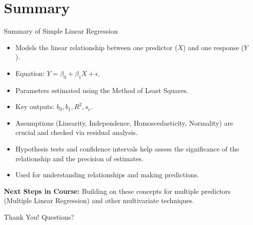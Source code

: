 \documentclass[aspectratio=169]{beamer}
\begin{document}
\section{Summary}
\begin{frame}{Summary of Simple Linear Regression}
  \begin{itemize}
    \item Models the linear relationship between one predictor ($X$) and one response ($Y$).
    \item Equation: $Y = \beta_0 + \beta_1 X + \epsilon$.
    \item Parameters estimated using the Method of Least Squares.
    \item Key outputs: $b_0, b_1, R^2, s_e$.
    \item Assumptions (Linearity, Independence, Homoscedasticity, Normality) are crucial and checked via residual analysis.
    \item Hypothesis tests and confidence intervals help assess the significance of the relationship and the precision of estimates.
    \item Used for understanding relationships and making predictions.
  \end{itemize}
  \textbf{Next Steps in Course:} Building on these concepts for multiple predictors (Multiple Linear Regression) and other multivariate techniques.
\end{frame}

\begin{frame}
  \centering
  \Huge Thank You!
  \vspace{1cm}
  \normalsize Questions?
\end{frame}
\end{document}
